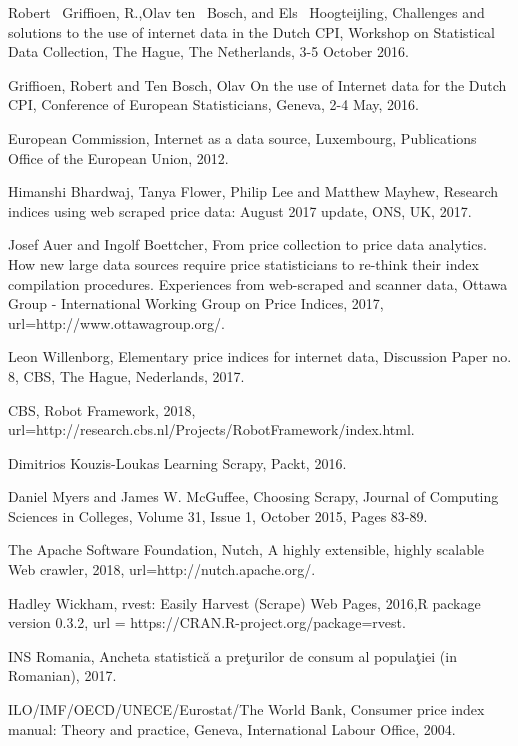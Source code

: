 \documentclass[]{article}
\begin{document}
\begin{thebibliography}{99}
Robert ~Griffioen, R.,Olav ten ~Bosch, and Els ~Hoogteijling, 
Challenges and solutions to the use of internet data in the Dutch CPI, 
Workshop on Statistical Data Collection, The Hague, The Netherlands, 3-5 October 2016.

Griffioen, Robert and Ten Bosch, Olav
On the use of Internet data for the Dutch CPI,
Conference of European Statisticians, Geneva, 2-4 May, 2016.

European Commission,
Internet as a data source,
Luxembourg, Publications Office of the European Union, 2012.


Himanshi Bhardwaj, Tanya Flower, Philip Lee and Matthew Mayhew,
Research indices using web scraped price data: August 2017 update, ONS, UK, 2017.


Josef Auer and Ingolf Boettcher, 
From price collection to price data analytics. How new large data sources require price statisticians to re-think their index compilation procedures. Experiences from web-scraped and scanner data,
Ottawa Group - International Working Group on Price Indices, 2017,
url={http://www.ottawagroup.org/}.

Leon Willenborg,
Elementary price indices for internet data,
Discussion Paper no. 8,
CBS, The Hague, Nederlands, 2017.


CBS,
Robot Framework, 
2018,
url={http://research.cbs.nl/Projects/RobotFramework/index.html}.


Dimitrios Kouzis-Loukas
Learning Scrapy, Packt, 2016.

Daniel Myers and James W. McGuffee,
Choosing Scrapy,
Journal of Computing Sciences in Colleges,
Volume 31, Issue 1, October 2015,
Pages 83-89.

The Apache Software Foundation,
Nutch, A highly extensible, highly scalable Web crawler, 2018,
url={http://nutch.apache.org/}.

Hadley Wickham,
rvest: Easily Harvest (Scrape) Web Pages,
2016,{R package version 0.3.2},
url = {https://CRAN.R-project.org/package=rvest}.


INS Romania, Ancheta statistică a preţurilor de consum al populaţiei (in Romanian),
2017.

ILO/IMF/OECD/UNECE/Eurostat/The World Bank,
Consumer price index manual: Theory and practice,
Geneva, International Labour Office, 2004.


\end{thebibliography}
\end{document}
